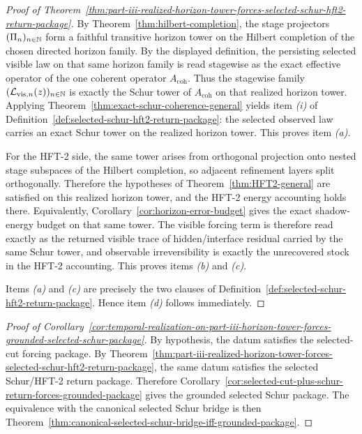 \begin{proof}[Proof of Theorem~\ref{thm:part-iii-realized-horizon-tower-forces-selected-schur-hft2-return-package}]
\label{proof:thm:part-iii-realized-horizon-tower-forces-selected-schur-hft2-return-package}
By Theorem~\ref{thm:hilbert-completion}, the stage projectors
\((\Pi_{n})_{n\in\mathbb{N}}\) form a faithful transitive horizon tower on the
Hilbert completion of the chosen directed horizon family. By the displayed
definition, the persisting selected visible law on that same horizon family is
read stagewise as the exact effective operator of the one coherent operator
\(A_{\mathrm{coh}}\). Thus the stagewise family
\((\mathcal L_{\mathrm{vis},n}(z))_{n\in\mathbb{N}}\) is exactly the Schur tower of
\(A_{\mathrm{coh}}\) on that realized horizon tower. Applying
Theorem~\ref{thm:exact-schur-coherence-general} yields item \emph{(i)} of
Definition~\ref{def:selected-schur-hft2-return-package}: the selected observed
law carries an exact Schur tower on the realized horizon tower. This proves
item \emph{(a)}.

For the HFT-2 side, the same tower arises from orthogonal projection onto
nested stage subspaces of the Hilbert completion, so adjacent refinement
layers split orthogonally. Therefore the hypotheses of
Theorem~\ref{thm:HFT2-general} are satisfied on this realized horizon tower,
and the HFT-2 energy accounting holds there. Equivalently,
Corollary~\ref{cor:horizon-error-budget} gives the exact shadow-energy budget
on that same tower. The visible forcing term is therefore read exactly as the
returned visible trace of hidden/interface residual carried by the same Schur
tower, and observable irreversibility is exactly the unrecovered stock in the
HFT-2 accounting. This proves items \emph{(b)} and \emph{(c)}.

Items \emph{(a)} and \emph{(c)} are precisely the two clauses of
Definition~\ref{def:selected-schur-hft2-return-package}. Hence item
\emph{(d)} follows immediately.
\end{proof}

\begin{proof}[Proof of Corollary~\ref{cor:temporal-realization-on-part-iii-horizon-tower-forces-grounded-selected-schur-package}]
\label{proof:cor:temporal-realization-on-part-iii-horizon-tower-forces-grounded-selected-schur-package}
By hypothesis, the datum satisfies the selected-cut forcing package. By
Theorem~\ref{thm:part-iii-realized-horizon-tower-forces-selected-schur-hft2-return-package},
the same datum satisfies the selected Schur/HFT-2 return package. Therefore
Corollary~\ref{cor:selected-cut-plus-schur-return-forces-grounded-package}
gives the grounded selected Schur package. The equivalence with the canonical
selected Schur bridge is then
Theorem~\ref{thm:canonical-selected-schur-bridge-iff-grounded-package}.
\end{proof}

